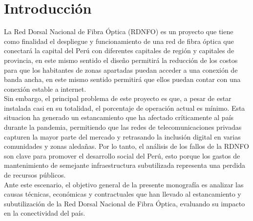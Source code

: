 \section{Introducción}
La Red Dorsal Nacional de Fibra Óptica (RDNFO) es un proyecto que tiene como finalidad el despliegue y
funcionamiento de una red de fibra óptica que conectará la capital del Perú con diferentes capitales de región y capitales de 
provincia, en este mismo sentido el diseño permitirá la reducción de los costos para que los habitantes de zonas apartadas puedan 
acceder a una conexión de banda ancha, en este mismo sentido 
permitirá que ellos puedan contar con una conexión estable a internet.\\
Sin embargo, el principal problema de este proyecto es que, a pesar de estar instalada casi en su totalidad, el porcentaje de 
operación actual es mínimo. Esta situacion ha generado un estancamiento que ha afectado críticamente al país durante la pandemia, 
permitiendo que las redes de telecomunicaciones privadas 
capturen la mayor parte del mercado y retrasando la inclusión digital en varias comunidades y zonas aledañas. Por lo tanto, el análisis de los 
fallos de la RDNFO son clave para promover el desarrollo social del Perú, esto porque los gastos de mantenimiento de semejante infraestructura 
subutilizada representa una perdida de recursos públicos.\\
Ante este escenario, el objetivo general de la presente monografía es analizar las causas técnicas, económicas y contractuales que han llevado al 
estancamiento y subutilización de la Red Dorsal Nacional de Fibra Óptica, evaluando su impacto en la conectividad del país.\\